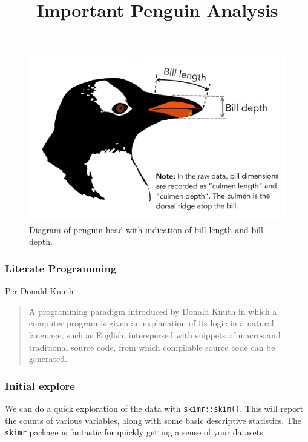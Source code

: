 \documentclass[
]{article}
\title{Important Penguin Analysis}
\author{}
\date{\vspace{-2.5em}}
\begin{document}
\maketitle

{
\setcounter{tocdepth}{2}
\tableofcontents
}
\begin{figure}
\centering
\includegraphics{culmen_depth.png}
\caption{Diagram of penguin head with indication of bill length and bill
depth.}
\end{figure}

\hypertarget{literate-programming}{%
\subsubsection{Literate Programming}\label{literate-programming}}

Per \href{https://en.wikipedia.org/wiki/Literate_programming}{Donald
Knuth}

\begin{quote}
A programming paradigm introduced by Donald Knuth in which a computer
program is given an explanation of its logic in a natural language, such
as English, interspersed with snippets of macros and traditional source
code, from which compilable source code can be generated.
\end{quote}

\hypertarget{initial-explore}{%
\subsubsection{Initial explore}\label{initial-explore}}

We can do a quick exploration of the data with \texttt{skimr::skim()}.
This will report the counts of various variables, along with some basic
descriptive statistics. The \texttt{skimr} package is fantastic for
quickly getting a sense of your datasets.
\end{document}
